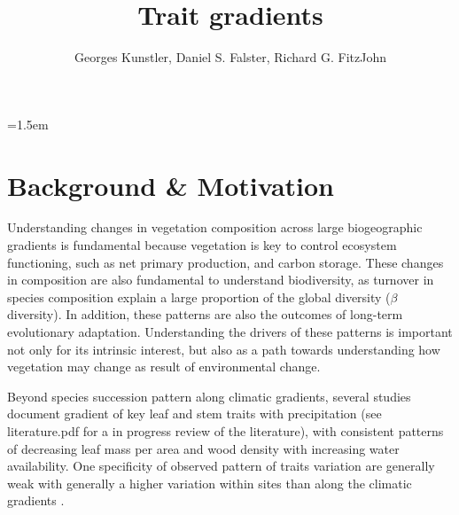 \documentclass[a4paper,11pt]{article}
\title{Trait gradients}
\author{ Georges Kunstler, Daniel S. Falster, Richard G. FitzJohn}
\date{}
\affiliation{Department of Biological Sciences, Macquarie University,
  Sydney, Australia}
\begin{document}
\mstitleshort
\parindent=1.5em
\addtolength{\parskip}{.3em}


\section{Background \& Motivation}

Understanding changes in vegetation composition across large biogeographic gradients is fundamental because vegetation is key to control ecosystem functioning, such as net primary production, and carbon storage. These changes in composition are also fundamental to understand biodiversity, as turnover in species composition explain a large proportion of the global diversity ($\beta$ diversity). In addition, these patterns are also the outcomes of long-term evolutionary adaptation. Understanding the drivers of these patterns is important not only for its intrinsic interest, but also as a path towards understanding how vegetation may change as result of environmental change.

Beyond species succession pattern along climatic gradients, several studies document gradient of key leaf and stem traits with precipitation (see literature.pdf for a in progress review of the literature), with consistent patterns of decreasing leaf mass per area \citep{Wright-2004,Onoda-2011,Moles-2014} and wood density \citep{Chave-2006} with increasing water availability.  One specificity of observed pattern of traits variation are generally weak with generally a higher variation within sites than along the climatic gradients \citep[see][]{Wright-2004}. 



\end{document}

